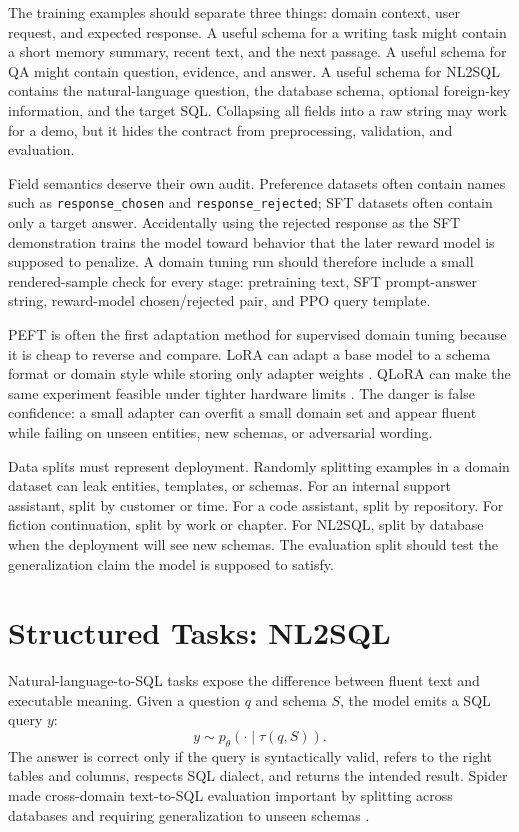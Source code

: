 The training examples should separate three things: domain context, user request, and expected response. A useful schema for a writing task might contain a short memory summary, recent text, and the next passage. A useful schema for QA might contain question, evidence, and answer. A useful schema for NL2SQL contains the natural-language question, the database schema, optional foreign-key information, and the target SQL. Collapsing all fields into a raw string may work for a demo, but it hides the contract from preprocessing, validation, and evaluation.

Field semantics deserve their own audit. Preference datasets often contain names such as \texttt{response\_chosen} and \texttt{response\_rejected}; SFT datasets often contain only a target answer. Accidentally using the rejected response as the SFT demonstration trains the model toward behavior that the later reward model is supposed to penalize. A domain tuning run should therefore include a small rendered-sample check for every stage: pretraining text, SFT prompt-answer string, reward-model chosen/rejected pair, and PPO query template.

PEFT is often the first adaptation method for supervised domain tuning because it is cheap to reverse and compare. LoRA can adapt a base model to a schema format or domain style while storing only adapter weights \cite{hu2021lora}. QLoRA can make the same experiment feasible under tighter hardware limits \cite{dettmers2023qlora}. The danger is false confidence: a small adapter can overfit a small domain set and appear fluent while failing on unseen entities, new schemas, or adversarial wording.

Data splits must represent deployment. Randomly splitting examples in a domain dataset can leak entities, templates, or schemas. For an internal support assistant, split by customer or time. For a code assistant, split by repository. For fiction continuation, split by work or chapter. For NL2SQL, split by database when the deployment will see new schemas. The evaluation split should test the generalization claim the model is supposed to satisfy.

\section{Structured Tasks: NL2SQL}
\label{sec:nl2sql}

Natural-language-to-SQL tasks expose the difference between fluent text and executable meaning. Given a question $q$ and schema $S$, the model emits a SQL query $y$:
\begin{equation}
  y \sim p_{\theta}(\cdot \mid \tau(q,S)).
  \label{eq:nl2sql-generation}
\end{equation}
The answer is correct only if the query is syntactically valid, refers to the right tables and columns, respects SQL dialect, and returns the intended result. Spider made cross-domain text-to-SQL evaluation important by splitting across databases and requiring generalization to unseen schemas \cite{yu2018spider}.

